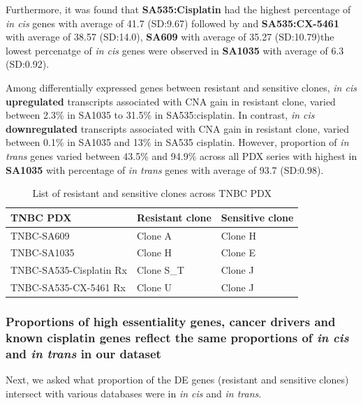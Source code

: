 Furthermore, it was found that \textbf{SA535:Cisplatin} had the highest percentage of \textit{in cis} genes with average of 41.7 (SD:9.67) followed by  and \textbf{SA535:CX-5461} with average of 38.57 (SD:14.0), \textbf{SA609} with average of 35.27 (SD:10.79)the lowest percenatge of \textit{in cis} genes were observed in \textbf{SA1035} with average of 6.3 (SD:0.92).

Among differentially expressed genes between resistant and sensitive clones, \textit{in cis} \textbf{upregulated} transcripts associated with CNA gain in resistant clone, varied between 2.3\% in SA1035 to 31.5\% in SA535:cisplatin. In contrast, \textit{in cis} \textbf{downregulated} transcripts associated with CNA gain in resistant clone, varied between 0.1\% in SA1035 and 13\% in SA535 cisplatin. However, proportion of \textit{in trans} genes varied between 43.5\% and 94.9\% across all PDX series with highest in \textbf{SA1035} with percentage of \textit{in trans} genes with average of 93.7 (SD:0.98).


 \begin{table}[htbp]
   
   \centering
   \caption{List of resistant and sensitive clones across TNBC PDX}
     \begin{tabular}{|l|l|l|}
      \hline
     TNBC PDX & Resistant clone & Sensitive clone \\
     \hline
     TNBC-SA609  & Clone A & Clone H \\
     TNBC-SA1035 & Clone H & Clone E \\
     TNBC-SA535-Cisplatin Rx & Clone S\_T & Clone J \\
     TNBC-SA535-CX-5461 Rx & Clone U & Clone J \\  
     \hline
     \end{tabular}%
   \label{tab:Listofresistantandsensitiveclones}%
   
 \end{table}%

\subsubsection{Proportions of high essentiality genes, cancer drivers and known cisplatin genes reflect the same proportions of \textit{in cis} and \textit{in trans} in our dataset}
Next, we asked what proportion of the \ac{DE} genes (resistant and sensitive clones) intersect with various databases were in \textit{in cis} and \textit{in trans}.

